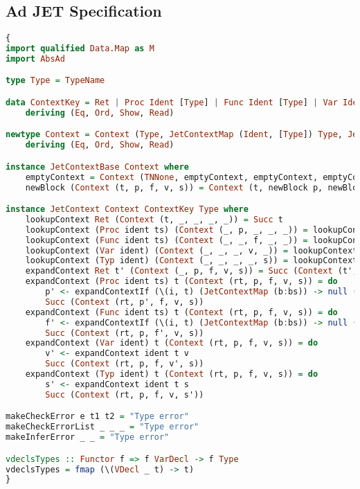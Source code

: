 \subsection{Ad JET Specification}
\begin{lstlisting}[language=Haskell]
{
import qualified Data.Map as M
import AbsAd

type Type = TypeName

data ContextKey = Ret | Proc Ident [Type] | Func Ident [Type] | Var Ident | Typ Ident
    deriving (Eq, Ord, Show, Read)

newtype Context = Context (Type, JetContextMap (Ident, [Type]) Type, JetContextMap (Ident, [Type]) Type, JetContextMap Ident Type, JetContextMap Ident Type)
    deriving (Eq, Ord, Show, Read)

instance JetContextBase Context where
    emptyContext = Context (TNNone, emptyContext, emptyContext, emptyContext, emptyContext)
    newBlock (Context (t, p, f, v, s)) = Context (t, newBlock p, newBlock f, newBlock v, s)

instance JetContext Context ContextKey Type where
    lookupContext Ret (Context (t, _, _, _, _)) = Succ t
    lookupContext (Proc ident ts) (Context (_, p, _, _, _)) = lookupContext (ident, ts) p
    lookupContext (Func ident ts) (Context (_, _, f, _, _)) = lookupContext (ident, ts) f
    lookupContext (Var ident) (Context (_, _, _, v, _)) = lookupContext ident v
    lookupContext (Typ ident) (Context (_, _, _, _, s)) = lookupContext ident s
    expandContext Ret t' (Context (_, p, f, v, s)) = Succ (Context (t', p, f, v, s))
    expandContext (Proc ident ts) t (Context (rt, p, f, v, s)) = do
        p' <- expandContextIf (\(i, t) (JetContextMap (b:bs)) -> null (filter (\(i', t') -> i == i') (M.keys b))) (ident, ts) t p
        Succ (Context (rt, p', f, v, s))
    expandContext (Func ident ts) t (Context (rt, p, f, v, s)) = do
        f' <- expandContextIf (\(i, t) (JetContextMap (b:bs)) -> null (filter (\(i', t') -> i == i') (M.keys b))) (ident, ts) t f
        Succ (Context (rt, p, f', v, s))
    expandContext (Var ident) t (Context (rt, p, f, v, s)) = do
        v' <- expandContext ident t v
        Succ (Context (rt, p, f, v', s))
    expandContext (Typ ident) t (Context (rt, p, f, v, s)) = do
        s' <- expandContext ident t s
        Succ (Context (rt, p, f, v, s'))

makeCheckError e t1 t2 = "Type error"
makeCheckErrorList _ _ _ = "Type error"
makeInferError _ _ = "Type error"

vdeclsTypes :: Functor f => f VarDecl -> f Type
vdeclsTypes = fmap (\(VDecl _ t) -> t)
}


\end{lstlisting}
